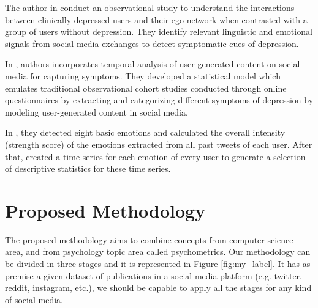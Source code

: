 \documentclass[sigconf]{acmart}
\begin{document}
The author in \cite{Vedula2017} conduct an observational study to understand the interactions between clinically depressed users and their ego-network when contrasted with a group of users without depression. They identify relevant linguistic and emotional signals from social media exchanges to detect symptomatic cues of depression.

In \cite{Yazdavar:2017:SAM:3110025.3123028}, authors incorporates temporal analysis of user-generated content on social media for capturing symptoms. They developed a statistical model which emulates traditional observational cohort studies conducted through online questionnaires by extracting and categorizing different symptoms of depression by modeling user-generated content in social media.

In \cite{Chen2018}, they detected eight basic emotions and calculated the overall intensity (strength score) of the emotions extracted from all past tweets of each user. After that, created a time series for each emotion of every user to generate a selection of descriptive statistics for these time series.


\section{Proposed Methodology}\label{sec:proposal}

The proposed methodology aims to combine concepts from computer science area, and from psychology topic area called psychometrics.
Our methodology can be divided in three stages and it is represented in Figure \ref{fig:my_label}. It has as premise a given dataset of publications in a social media platform (e.g. twitter, reddit, instagram, etc.), we should be capable to apply all the stages for any kind of social media.
\end{document}
